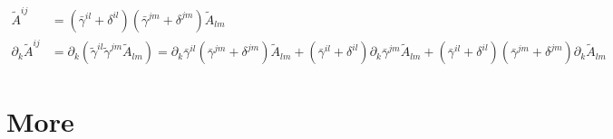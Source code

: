 \documentclass[prd,aps,a4paper,superscriptaddress,onecolumn,footinbib]{revtex4}
\begin{document}
\begin{align}
  \tilde{A}^{ij}
  &=(\bar\gamma^{il}+\delta^{il})(\bar\gamma^{jm}+\delta^{jm})\tilde{A}_{lm}
  \\
  \partial_k\tilde{A}^{ij}
  &=\partial_k
  \left(
    \tilde\gamma^{il}\tilde\gamma^{jm}\tilde{A}_{lm}
  \right)
  =\partial_k\bar\gamma^{il}(\bar\gamma^{jm}+\delta^{jm})\tilde{A}_{lm}
  +(\bar\gamma^{il}+\delta^{il})\partial_k\bar\gamma^{jm}\tilde{A}_{lm}
  +(\bar\gamma^{il}+\delta^{il})(\bar\gamma^{jm}+\delta^{jm})\partial_k\tilde{A}_{lm}
\end{align}


\section{More}
\cite{alexander1990solving}





\end{document}
